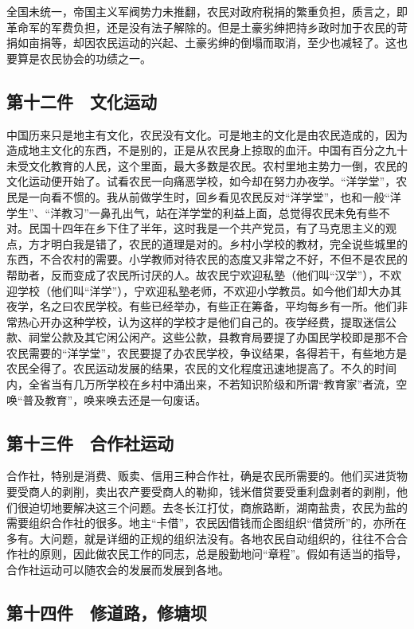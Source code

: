 全国未统一，帝国主义军阀势力未推翻，农民对政府税捐的繁重负担，质言之，即革命军的军费负担，还是没有法子解除的。但是土豪劣绅把持乡政时加于农民的苛捐如亩捐等，却因农民运动的兴起、土豪劣绅的倒塌而取消，至少也减轻了。这也要算是农民协会的功绩之一。

\subsection*{第十二件　文化运动}

中国历来只是地主有文化，农民没有文化。可是地主的文化是由农民造成的，因为造成地主文化的东西，不是别的，正是从农民身上掠取的血汗。中国有百分之九十未受文化教育的人民，这个里面，最大多数是农民。农村里地主势力一倒，农民的文化运动便开始了。试看农民一向痛恶学校，如今却在努力办夜学。“洋学堂”，农民是一向看不惯的。我从前做学生时，回乡看见农民反对“洋学堂”，也和一般“洋学生”、“洋教习”一鼻孔出气，站在洋学堂的利益上面，总觉得农民未免有些不对。民国十四年在乡下住了半年，这时我是一个共产党员，有了马克思主义的观点，方才明白我是错了，农民的道理是对的。乡村小学校的教材，完全说些城里的东西，不合农村的需要。小学教师对待农民的态度又非常之不好，不但不是农民的帮助者，反而变成了农民所讨厌的人。故农民宁欢迎私塾（他们叫“汉学”），不欢迎学校（他们叫“洋学”），宁欢迎私塾老师，不欢迎小学教员。如今他们却大办其夜学，名之曰农民学校。有些已经举办，有些正在筹备，平均每乡有一所。他们非常热心开办这种学校，认为这样的学校才是他们自己的。夜学经费，提取迷信公款、祠堂公款及其它闲公闲产。这些公款，县教育局要提了办国民学校即是那不合农民需要的“洋学堂”，农民要提了办农民学校，争议结果，各得若干，有些地方是农民全得了。农民运动发展的结果，农民的文化程度迅速地提高了。不久的时间内，全省当有几万所学校在乡村中涌出来，不若知识阶级和所谓“教育家”者流，空唤“普及教育”，唤来唤去还是一句废话。

\subsection*{第十三件　合作社运动}

合作社，特别是消费、贩卖、信用三种合作社，确是农民所需要的。他们买进货物要受商人的剥削，卖出农产要受商人的勒抑，钱米借贷要受重利盘剥者的剥削，他们很迫切地要解决这三个问题。去冬长江打仗，商旅路断，湖南盐贵，农民为盐的需要组织合作社的很多。地主“卡借”，农民因借钱而企图组织“借贷所”的，亦所在多有。大问题，就是详细的正规的组织法没有。各地农民自动组织的，往往不合合作社的原则，因此做农民工作的同志，总是殷勤地问“章程”。假如有适当的指导，合作社运动可以随农会的发展而发展到各地。

\subsection*{第十四件　修道路，修塘坝}

